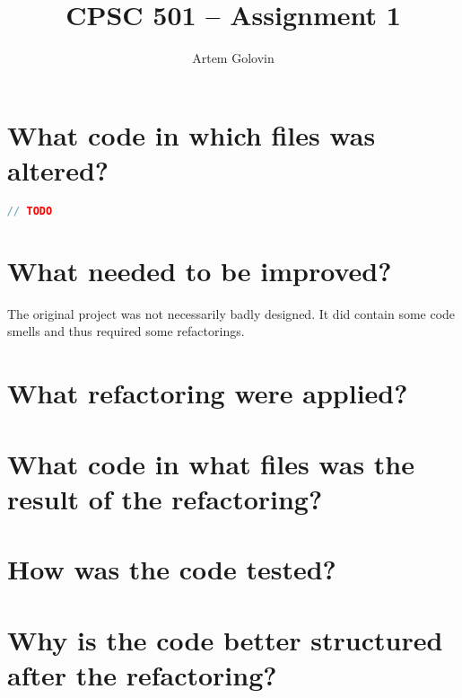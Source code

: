 \documentclass{article}
\title{CPSC 501 -- Assignment 1}
\author{Artem Golovin}
\date{}
\begin{document}
\maketitle

\section{What code in which files was altered?}


\begin{lstlisting}[language=Java]
// TODO
\end{lstlisting}


\section{What needed to be improved?}

The original project was not necessarily badly designed. It did contain some code smells and thus required some refactorings.


\section{What refactoring were applied?}


\section{What code in what files was the result of the refactoring?}


\section{How was the code tested?}


\section{Why is the code better structured after the refactoring?}

\end{document}
